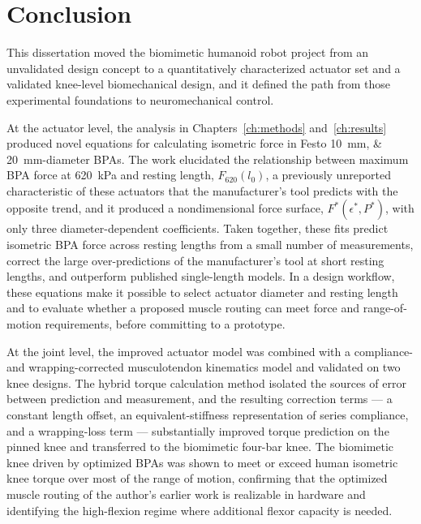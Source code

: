 \chapter{Conclusion}\label{ch:conclusion}
\graphicspath{{figs/60-conclusion/}}

This dissertation moved the biomimetic humanoid robot project from an unvalidated design concept to a quantitatively characterized actuator set and a validated knee-level biomechanical design, and it defined the path from those experimental foundations to neuromechanical control.

At the actuator level, the analysis in Chapters~\ref{ch:methods} and~\ref{ch:results} produced novel equations for calculating isometric force in Festo \qtylist{10;20}{\mm}-diameter BPAs. The work elucidated the relationship between maximum BPA force at \qty{620}{\kPa} and resting length, $F_{620}(l_0)$, a previously unreported characteristic of these actuators that the manufacturer's tool predicts with the opposite trend, and it produced a nondimensional force surface, $F^*(\epsilon^*,P^*)$, with only three diameter-dependent coefficients. Taken together, these fits predict isometric BPA force across resting lengths from a small number of measurements, correct the large over-predictions of the manufacturer's tool at short resting lengths, and outperform published single-length models. In a design workflow, these equations make it possible to select actuator diameter and resting length and to evaluate whether a proposed muscle routing can meet force and range-of-motion requirements, before committing to a prototype.

At the joint level, the improved actuator model was combined with a compliance- and wrapping-corrected musculotendon kinematics model and validated on two knee designs. The hybrid torque calculation method isolated the sources of error between prediction and measurement, and the resulting correction terms --- a constant length offset, an equivalent-stiffness representation of series compliance, and a wrapping-loss term --- substantially improved torque prediction on the pinned knee and transferred to the biomimetic four-bar knee. The biomimetic knee driven by optimized BPAs was shown to meet or exceed human isometric knee torque over most of the range of motion, confirming that the optimized muscle routing of the author's earlier work is realizable in hardware and identifying the high-flexion regime where additional flexor capacity is needed.

